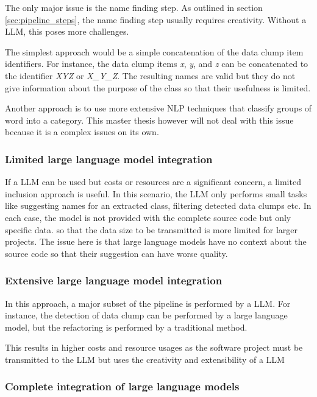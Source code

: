 The only major issue is the name finding step. As outlined in section \ref{sec:pipeline_steps}, the name finding step usually requires creativity. Without a \ac{LLM}, this poses more challenges.

The simplest approach would be a simple concatenation of the data clump item identifiers. For instance, the data clump items \textit{x}, \textit{y}, and \textit{z} can be concatenated to  the identifier \textit{XYZ} or \textit{X\_Y\_Z}. The resulting names are valid but they do not give information about the purpose of the class so that their usefulness is limited.

Another approach is to use more extensive \ac{NLP} techniques that classify groups of word into a category. This master thesis however will not deal with this issue because it is a complex issues on its own.

\subsubsection{Limited large language model integration}

If a \ac{LLM} can be used but costs or resources are a significant concern, a limited inclusion approach is useful. In this scenario, the \ac{LLM} only performs small tasks like suggesting names for an extracted class, filtering detected data clumps etc. In each case, the model is not provided with the  complete source code but only specific data. so that the data size to be transmitted is more limited for larger projects. The issue here is that large language models have no context about the source code so that their suggestion can have worse quality. 

\subsubsection{Extensive large language model integration }

In this approach, a major subset of the pipeline is performed by a \ac{LLM}. For instance, the detection of data clump can be performed by a large language model, but the refactoring is performed by a traditional method. 

This results in higher costs and resource usages as the software project must be transmitted to the \ac{LLM} but uses the creativity and extensibility of a \ac{LLM}

\subsubsection{Complete integration of large language models}

